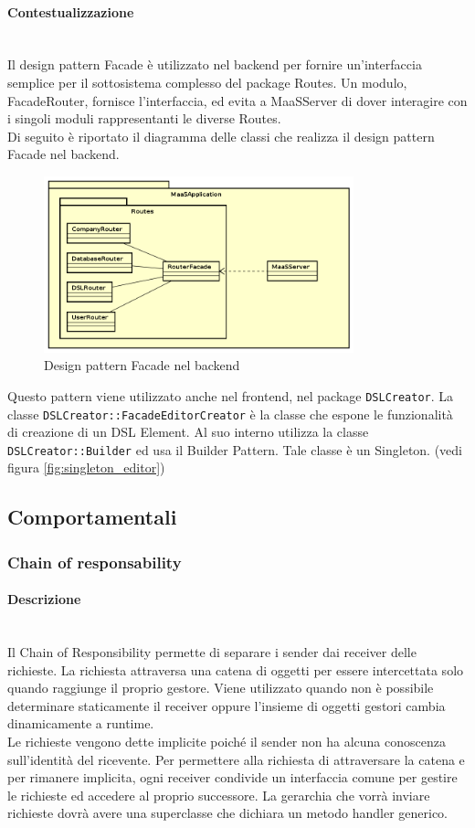 \paragraph{Contestualizzazione}\mbox{} \\
Il design pattern Facade è utilizzato nel backend per fornire un'interfaccia semplice per il sottosistema complesso del package Routes. Un modulo, FacadeRouter, fornisce l'interfaccia, ed evita a MaaSServer di dover interagire con i singoli moduli rappresentanti le diverse Routes. \\
Di seguito è riportato il diagramma delle classi che realizza il design pattern Facade nel backend.
\begin{figure}[H]
\centering
\includegraphics[width=0.8\textwidth]{res/sections/backend/facadeRoutes.png}
\caption{Design pattern Facade nel backend}
\end{figure}
Questo pattern viene utilizzato anche nel frontend, nel package \texttt{DSLCreator}. La classe \texttt{DSLCreator::FacadeEditorCreator} è la classe che espone le funzionalità di creazione di un DSL Element. Al suo interno utilizza la classe \texttt{DSLCreator::Builder} ed usa il Builder Pattern. Tale classe è un Singleton. (vedi figura \ref{fig:singleton_editor})
\subsection{Comportamentali}
\subsubsection{Chain of responsability}
\paragraph{Descrizione} \mbox{} \\
Il Chain of Responsibility permette di separare i sender dai receiver delle richieste. La richiesta attraversa una catena di oggetti per essere intercettata solo quando raggiunge il proprio gestore. Viene utilizzato quando non è possibile determinare staticamente il receiver oppure l’insieme di oggetti gestori cambia dinamicamente a runtime. \\
Le richieste vengono dette implicite poiché il sender non ha alcuna conoscenza sull’identità del ricevente. Per permettere alla richiesta di attraversare la catena e per rimanere implicita, ogni receiver condivide un interfaccia comune per gestire le richieste ed accedere al proprio successore. La gerarchia che vorrà inviare richieste dovrà avere una superclasse che dichiara un metodo handler generico.
